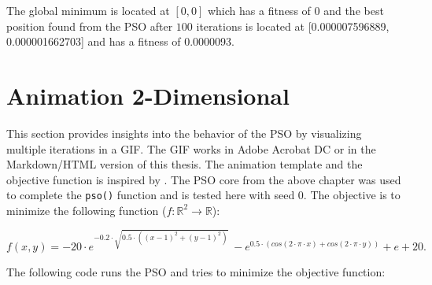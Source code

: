 \documentclass[
  oneside, a4paper, 12pt, openany]{book}
\theoremstyle{definition}
\theoremstyle{definition}
\theoremstyle{definition}
\theoremstyle{definition}
\theoremstyle{remark}
\begin{document}
\normalsize\vspace{0.1cm}

The global minimum is located at \([0, 0]\) which has a fitness of \(0\) and the best position found from the PSO after \(100\) iterations is located at {[}0.000007596889, 0.000001662703{]} and has a fitness of 0.0000093.

\hypertarget{animation-2-dimensional}{%
\section{Animation 2-Dimensional}\label{animation-2-dimensional}}

This section provides insights into the behavior of the PSO by visualizing multiple iterations in a GIF. The GIF works in Adobe Acrobat DC or in the Markdown/HTML version of this thesis. The animation template and the objective function is inspired by \citep{Rtic2021}. The PSO core from the above chapter was used to complete the \texttt{pso()} function and is tested here with seed 0. The objective is to minimize the following function (\(f:\mathbb{R}^2 \rightarrow \mathbb{R}\)):

\[
f(x, y) = -20\cdot e^{-0.2 \cdot \sqrt{0.5 \cdot ((x-1)^2 + (y-1)^2)}} \ - e^{0.5 \cdot ( cos(2\cdot \pi \cdot x) + cos(2\cdot \pi \cdot y))} + e + 20.
\]

The following code runs the PSO and tries to minimize the objective function:

\vspace{0.1cm}\fontsize{11}{12}\selectfont
\end{document}
